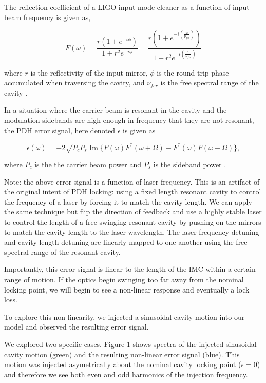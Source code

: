 The reflection coefficient of a LIGO input mode cleaner as a function of input beam frequency is given as,

\begin{equation}
F(\omega) = \frac{r(1 + e^{-i\phi})}{1+r^2e^{-i\phi}} = \frac{r(1 + e^{-i(\frac{\omega}{\nu_{fsr}})})}{1+r^2e^{-i(\frac{\omega}{\nu_{fsr}})}}
\end{equation}

where $r$ is the reflectivity of the input mirror, $\phi$ is the round-trip phase accumulated when traversing the cavity, and $\nu_{fsr}$ is the free spectral range of the cavity \cite{Mueller}.

In a situation where the carrier beam is resonant in the cavity and the modulation sidebands are high enough in frequency that they are not resonant, the PDH error signal, here denoted $\epsilon$ is given as

\begin{equation}
\epsilon(\omega) = -2\sqrt{P_{c}P_{s}}\operatorname{Im}\{F(\omega)F^*(\omega + \Omega) - F^*(\omega)F(\omega - \Omega)\},
\end{equation}

where $P_{c}$ is the the carrier beam power and $P_{s}$ is the sideband power \cite{Black01}.

Note: the above error signal is a function of laser frequency. This is an artifact of the original intent of PDH locking: using a fixed length resonant cavity to control the frequency of a laser by forcing it to match the cavity length. We can apply the same technique but flip the direction of feedback and use a highly stable laser to control the length of a free swinging resonant cavity by pushing on the mirrors to match the cavity length to the laser wavelength. The laser frequency detuning and cavity length detuning are linearly mapped to one another using the free spectral range of the resonant cavity.

Importantly, this error signal is linear to the length of the IMC within a certain range of motion. If the optics begin swinging too far away from the nominal locking point, we will begin to see a non-linear response and eventually a lock loss.

To explore this non-linearity, we injected a sinusoidal cavity motion into our model and observed the resulting error signal.

We explored two specific cases. Figure 1 shows spectra of the injected sinusoidal cavity motion (green) and the resulting non-linear error signal (blue). This motion was injected asymetrically about the nominal cavity locking point ($\epsilon = 0$) and therefore we see both even and odd harmonics of the injection frequency.

